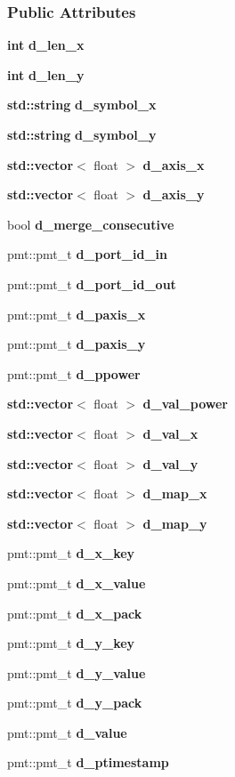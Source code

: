 \subsubsection*{Public Attributes}
\begin{DoxyCompactItemize}
\item 
{\bf int} {\bf d\+\_\+len\+\_\+x}
\item 
{\bf int} {\bf d\+\_\+len\+\_\+y}
\item 
{\bf std\+::string} {\bf d\+\_\+symbol\+\_\+x}
\item 
{\bf std\+::string} {\bf d\+\_\+symbol\+\_\+y}
\item 
{\bf std\+::vector}$<$ float $>$ {\bf d\+\_\+axis\+\_\+x}
\item 
{\bf std\+::vector}$<$ float $>$ {\bf d\+\_\+axis\+\_\+y}
\item 
bool {\bf d\+\_\+merge\+\_\+consecutive}
\item 
pmt\+::pmt\+\_\+t {\bf d\+\_\+port\+\_\+id\+\_\+in}
\item 
pmt\+::pmt\+\_\+t {\bf d\+\_\+port\+\_\+id\+\_\+out}
\item 
pmt\+::pmt\+\_\+t {\bf d\+\_\+paxis\+\_\+x}
\item 
pmt\+::pmt\+\_\+t {\bf d\+\_\+paxis\+\_\+y}
\item 
pmt\+::pmt\+\_\+t {\bf d\+\_\+ppower}
\item 
{\bf std\+::vector}$<$ float $>$ {\bf d\+\_\+val\+\_\+power}
\item 
{\bf std\+::vector}$<$ float $>$ {\bf d\+\_\+val\+\_\+x}
\item 
{\bf std\+::vector}$<$ float $>$ {\bf d\+\_\+val\+\_\+y}
\item 
{\bf std\+::vector}$<$ float $>$ {\bf d\+\_\+map\+\_\+x}
\item 
{\bf std\+::vector}$<$ float $>$ {\bf d\+\_\+map\+\_\+y}
\item 
pmt\+::pmt\+\_\+t {\bf d\+\_\+x\+\_\+key}
\item 
pmt\+::pmt\+\_\+t {\bf d\+\_\+x\+\_\+value}
\item 
pmt\+::pmt\+\_\+t {\bf d\+\_\+x\+\_\+pack}
\item 
pmt\+::pmt\+\_\+t {\bf d\+\_\+y\+\_\+key}
\item 
pmt\+::pmt\+\_\+t {\bf d\+\_\+y\+\_\+value}
\item 
pmt\+::pmt\+\_\+t {\bf d\+\_\+y\+\_\+pack}
\item 
pmt\+::pmt\+\_\+t {\bf d\+\_\+value}
\item 
pmt\+::pmt\+\_\+t {\bf d\+\_\+ptimestamp}
\end{DoxyCompactItemize}

